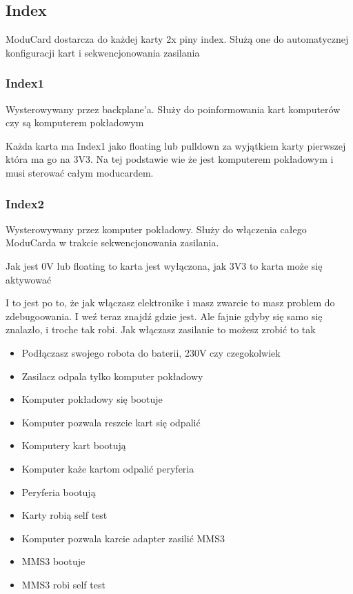 \documentclass[b5paper, 10pt, twoside]{book}
\begin{document}
\subsection{Index}
ModuCard dostarcza do każdej karty 2x piny index. Służą one do automatycznej konfiguracji kart i sekwencjonowania zasilania

\subsubsection{Index1}
Wysterowywany przez backplane'a. Służy do poinformowania kart komputerów czy są komputerem pokładowym

Każda karta ma Index1 jako floating lub pulldown za wyjątkiem karty pierwszej która ma go na 3V3. Na tej podstawie wie że jest komputerem pokładowym i musi sterować całym moducardem.

\subsubsection{Index2}
Wysterowywany przez komputer pokładowy. Służy do włączenia całego ModuCarda w trakcie sekwencjonowania zasilania.

Jak jest 0V lub floating to karta jest wyłączona, jak 3V3 to karta może się aktywować

I to jest po to, że jak włączasz elektronike i masz zwarcie to masz problem do zdebugoowania. I weź teraz znajdź gdzie jest. Ale fajnie gdyby się samo się znalazło, i troche tak robi. Jak włączasz zasilanie to możesz zrobić to tak

\begin{itemize}
  \item Podłączasz swojego robota do baterii, 230V czy czegokolwiek
  \item Zasilacz odpala tylko komputer pokładowy
  \item Komputer pokładowy się bootuje
  \item Komputer pozwala reszcie kart się odpalić
  \item Komputery kart bootują
  \item Komputer każe kartom odpalić peryferia
  \item Peryferia bootują
  \item Karty robią self test
  \item Komputer pozwala karcie adapter zasilić MMS3
  \item MMS3 bootuje
  \item MMS3 robi self test
\end{itemize}
\end{document}
